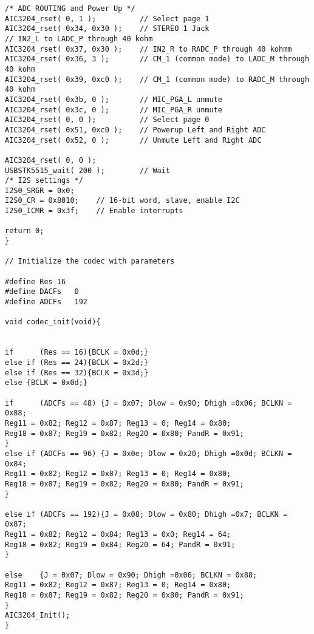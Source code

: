 \begin{lstlisting}
/* ADC ROUTING and Power Up */
AIC3204_rset( 0, 1 );          // Select page 1
AIC3204_rset( 0x34, 0x30 );    // STEREO 1 Jack
// IN2_L to LADC_P through 40 kohm
AIC3204_rset( 0x37, 0x30 );    // IN2_R to RADC_P through 40 kohmm
AIC3204_rset( 0x36, 3 );       // CM_1 (common mode) to LADC_M through 40 kohm
AIC3204_rset( 0x39, 0xc0 );    // CM_1 (common mode) to RADC_M through 40 kohm
AIC3204_rset( 0x3b, 0 );       // MIC_PGA_L unmute
AIC3204_rset( 0x3c, 0 );       // MIC_PGA_R unmute
AIC3204_rset( 0, 0 );          // Select page 0
AIC3204_rset( 0x51, 0xc0 );    // Powerup Left and Right ADC
AIC3204_rset( 0x52, 0 );       // Unmute Left and Right ADC

AIC3204_rset( 0, 0 );    
USBSTK5515_wait( 200 );        // Wait
/* I2S settings */
I2S0_SRGR = 0x0;
I2S0_CR = 0x8010;    // 16-bit word, slave, enable I2C
I2S0_ICMR = 0x3f;    // Enable interrupts

return 0;
}

// Initialize the codec with parameters

#define Res	16
#define DACFs	0
#define ADCFs	192

void codec_init(void){


if 		(Res == 16){BCLK = 0x0d;}
else if (Res == 24){BCLK = 0x2d;}
else if (Res == 32){BCLK = 0x3d;}
else {BCLK = 0x0d;}

if 		(ADCFs == 48) {J = 0x07; Dlow = 0x90; Dhigh =0x06; BCLKN = 0x88;
Reg11 = 0x82; Reg12 = 0x87; Reg13 = 0; Reg14 = 0x80; 	
Reg18 = 0x87; Reg19 = 0x82; Reg20 = 0x80; PandR = 0x91;
}
else if	(ADCFs == 96) {J = 0x0e; Dlow = 0x20; Dhigh =0x0d; BCLKN = 0x84;
Reg11 = 0x82; Reg12 = 0x87; Reg13 = 0; Reg14 = 0x80;
Reg18 = 0x87; Reg19 = 0x82; Reg20 = 0x80; PandR = 0x91;
}

else if (ADCFs == 192){J = 0x08; Dlow = 0x80; Dhigh =0x7; BCLKN = 0x87; 
Reg11 = 0x82; Reg12 = 0x84; Reg13 = 0x0; Reg14 = 64; 	
Reg18 = 0x82; Reg19 = 0x84; Reg20 = 64; PandR = 0x91;
}	

else 	{J = 0x07; Dlow = 0x90; Dhigh =0x06; BCLKN = 0x88;
Reg11 = 0x82; Reg12 = 0x87; Reg13 = 0; Reg14 = 0x80; 	
Reg18 = 0x87; Reg19 = 0x82; Reg20 = 0x80; PandR = 0x91;
}
AIC3204_Init();
}
\end{lstlisting}